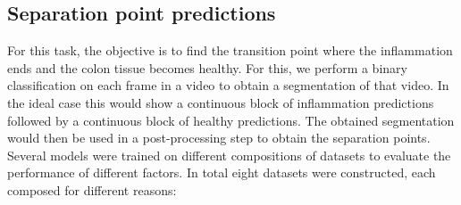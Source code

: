 \subsection{Separation point predictions}
For this task, the objective is to find the transition point where the inflammation ends and the colon tissue becomes healthy. For this, we perform a binary classification on each frame in a video to obtain a segmentation of that video. In the ideal case this would show a continuous block of inflammation predictions followed by a continuous block of healthy predictions. The obtained segmentation would then be used in a post-processing step to obtain the separation points.\\
Several models were trained on different compositions of datasets to evaluate the performance of different factors. In total eight datasets were constructed, each composed for different reasons:
